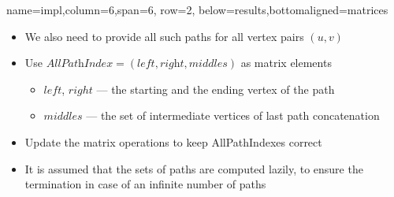 \documentclass[a0paper,portrait]{baposter}
\begin{document}
\begin{poster}


{name=impl,column=6,span=6, row=2, below=results,bottomaligned=matrices}
{
\begin{itemize}
	\item We also need to provide all such paths for all vertex pairs $(u,v)$
	\item Use $\textit{AllPathIndex} = (\textit{left},\textit{right},\textit{middles})$ as matrix elements
	\begin{itemize}
		\item $left$, $right$ --- the starting and the ending vertex of the path
		\item $middles$ --- the set of intermediate vertices of last path concatenation			
	\end{itemize}
    \item Update the matrix operations to keep AllPathIndexes correct
    \item It is	assumed that the sets of paths are computed lazily, to ensure the	termination in case of an infinite number of paths
\end{itemize}
}


\end{poster}
\end{document}
